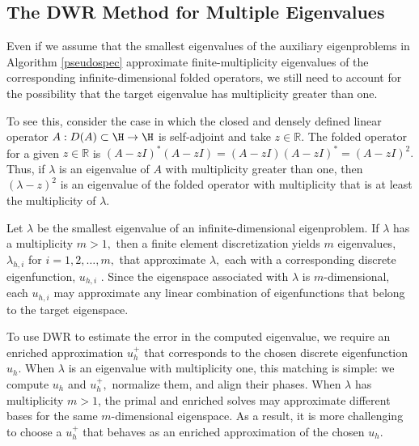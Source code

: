 \subsection{The DWR Method for Multiple Eigenvalues}


Even if we assume that the smallest eigenvalues of the auxiliary eigenproblems in Algorithm \ref{pseudospec} approximate finite-multiplicity eigenvalues of the corresponding infinite-dimensional folded operators, we still need to account for the possibility that the target eigenvalue has multiplicity greater than one.

To see this, consider the case in which the closed and densely defined linear operator $A:D(A) \subset \H \rightarrow \H$ is self-adjoint and take $z \in \mathbb{R}$.
The folded operator for a given $z \in \mathbb{R}$ is  $(A-zI)^*(A-zI) = (A-zI)(A-zI)^* = (A-zI)^2.$ Thus, if $\lambda$ is an eigenvalue of $A$ with multiplicity greater than one, then $(\lambda - z)^2$ is an eigenvalue of the folded operator with multiplicity that is at least the multiplicity of $\lambda.$ 



Let $\lambda$ be the smallest eigenvalue of an infinite-dimensional eigenproblem. If $\lambda$ has a multiplicity $m > 1,$ then a finite element discretization yields $m$ eigenvalues, $\lambda_{h, i}$ for $i = 1, 2, \dots, m,$ that approximate $\lambda,$ each with a corresponding discrete eigenfunction, $u_{h, i}$ \cite{Boffi, slep}. Since the eigenspace associated with $\lambda$ is $m$-dimensional, each $u_{h, i}$ may approximate any linear combination of eigenfunctions that belong to the target eigenspace. 



To use DWR to estimate the error in the computed eigenvalue, we require an enriched approximation $u_h^+$ that corresponds to the chosen discrete eigenfunction $u_h.$ When $\lambda$ is an eigenvalue with multiplicity one, this matching is simple: we compute $u_h$ and $u_h^+,$ normalize them, and align their phases. When $\lambda$ has multiplicity $m>1$, the primal and enriched solves may approximate different bases for the same $m$-dimensional eigenspace. As a result, it is more challenging to choose a $u_h^+$ that behaves as an enriched approximation of the chosen $u_h.$ 


